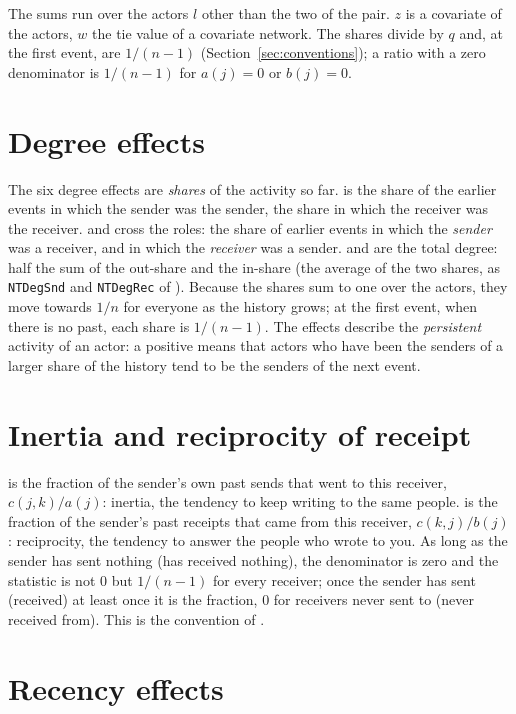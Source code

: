 \begin{table}[t]
\smallskip
\raggedright\footnotesize The sums run over the actors $l$ other than the two of the pair. $z$ is a covariate of the actors, $w$ the tie value of a covariate network. The shares divide by $q$ and, at the first event, are $1/(n-1)$ (Section~\ref{sec:conventions}); a ratio with a zero denominator is $1/(n-1)$ for $a(j)=0$ or $b(j)=0$.
\end{table}

\section{Degree effects}

The six degree effects are \emph{shares} of the activity so far.  is the share of the earlier events in which the sender was the sender,  the share in which the receiver was the receiver.  and  cross the roles: the share of earlier events in which the \emph{sender} was a receiver, and in which the \emph{receiver} was a sender.  and  are the total degree: half the sum of the out-share and the in-share (the average of the two shares, as \texttt{NTDegSnd} and \texttt{NTDegRec} of \relevent{}). Because the shares sum to one over the actors, they move towards $1/n$ for everyone as the history grows; at the first event, when there is no past, each share is $1/(n-1)$. The effects describe the \emph{persistent} activity of an actor: a positive  means that actors who have been the senders of a larger share of the history tend to be the senders of the next event.

\section{Inertia and reciprocity of receipt}

 is the fraction of the sender's own past sends that went to this receiver, $c(j,k)/a(j)$: inertia, the tendency to keep writing to the same people.  is the fraction of the sender's past receipts that came from this receiver, $c(k,j)/b(j)$: reciprocity, the tendency to answer the people who wrote to you. As long as the sender has sent nothing (has received nothing), the denominator is zero and the statistic is not 0 but $1/(n-1)$ for every receiver; once the sender has sent (received) at least once it is the fraction, 0 for receivers never sent to (never received from). This is the convention of \relevent{}.

\section{Recency effects}

